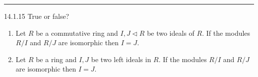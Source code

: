 \documentclass[a4paper, 12pt]{article}
\begin{document}
\noindent\rule{7in}{2.8pt}
\begin{problem}{14.1.15}
True or false?
\begin{enumerate}[(1)]
\item Let \(R\) be a commutative ring and \(I,J\lhd R\) be two ideals of \(R\). If the modules \(R/I\) and \(R/J\) are isomorphic then \(I=J\).
\item Let \(R\) be a ring and \(I,J\) be two left ideals in \(R\). If the modules \(R/I\) and \(R/J\) are isomorphic then \(I=J\).
\end{enumerate}
\end{problem}
\end{document}
